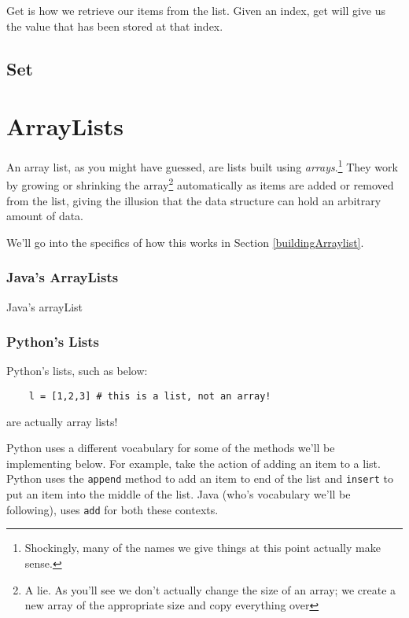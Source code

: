 Get is how we retrieve our items from the list.  Given an index, get will give us the value that has been stored at that index.



\subsection{Set}

\section{ArrayLists}
An array list, as you might have guessed, are lists built using \textit{arrays}.\footnote{Shockingly, many of the names we give things at this point actually make sense.}
They work by growing or shrinking the array\footnote{A lie.  As you'll see we don't actually change the size of an array;  we create a new array of the appropriate size and copy everything over} automatically as items are added or removed from the list, giving the illusion that the data structure can hold an arbitrary amount of data.

We'll go into the specifics of how this works in Section \ref{buildingArraylist}.


\subsubsection{Java's ArrayLists}
Java's arrayList
\subsubsection{Python's Lists}
Python's lists, such as below:
\begin{verbatim}
	l = [1,2,3] # this is a list, not an array!	
\end{verbatim}
are actually array lists! %

Python uses a different vocabulary for some of the methods we'll be implementing below.  
For example, take the action of adding an item to a list.
Python uses the \texttt{append} method to add an item to end of the list and \texttt{insert} to put an item into the middle of the list.
Java (who's vocabulary we'll be following), uses \texttt{add} for both these contexts. 









